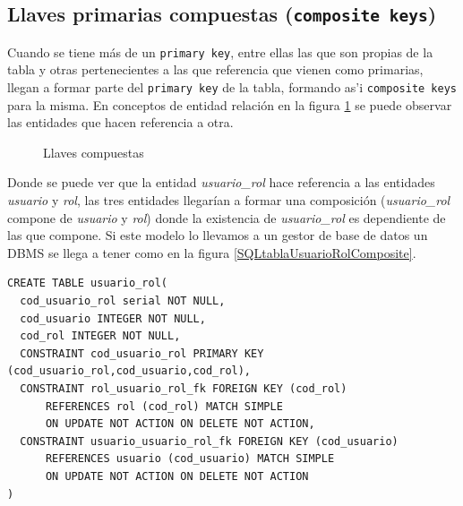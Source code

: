\subsection{Llaves primarias compuestas (\texttt{composite keys})}
Cuando se tiene m\'as de un \texttt{primary key}, entre ellas las que son propias de la tabla y otras pertenecientes a las que referencia que vienen como primarias, llegan a formar parte del \texttt{primary key} de la tabla, formando as'i \texttt{composite keys} para la misma. En conceptos de entidad relaci\'on en la figura  \ref{fig:llaves compuestas} se puede observar  las entidades que hacen referencia a otra.
\begin{figure}[H]
\centering
{}
\caption{Llaves compuestas} \label{fig:llaves compuestas}
\end{figure}
Donde se puede ver que la entidad \textit{usuario\_rol} hace referencia a las entidades \textit{usuario} y \textit{rol}, las tres entidades llegar\'ian a formar una composici\'on  (\textit{usuario\_rol} compone de \textit{usuario} y \textit{rol}) donde la existencia de \textit{usuario\_rol} es dependiente de las que compone. Si este modelo lo llevamos a un gestor de base de datos un DBMS se llega a tener como en la figura \ref{SQLtablaUsuarioRolComposite}.\\
\lstset{language=sql,breaklines=true}
\label{SQLtablaUsuarioRolComposite}
\begin{lstlisting}
CREATE TABLE usuario_rol(
  cod_usuario_rol serial NOT NULL,
  cod_usuario INTEGER NOT NULL,
  cod_rol INTEGER NOT NULL,
  CONSTRAINT cod_usuario_rol PRIMARY KEY (cod_usuario_rol,cod_usuario,cod_rol),
  CONSTRAINT rol_usuario_rol_fk FOREIGN KEY (cod_rol)
      REFERENCES rol (cod_rol) MATCH SIMPLE
      ON UPDATE NOT ACTION ON DELETE NOT ACTION,
  CONSTRAINT usuario_usuario_rol_fk FOREIGN KEY (cod_usuario)
      REFERENCES usuario (cod_usuario) MATCH SIMPLE
      ON UPDATE NOT ACTION ON DELETE NOT ACTION
)
\end{lstlisting}
